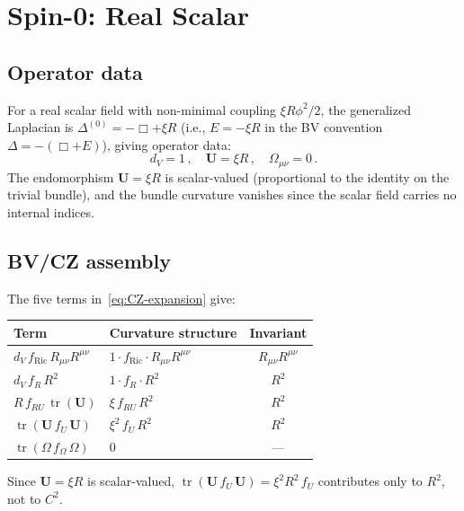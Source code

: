 \documentclass[aps,prd,twocolumn,superscriptaddress,nofootinbib,floatfix]{revtex4-2}
\theoremstyle{definition}
\theoremstyle{remark}
\newcommand{\Ricsq}{R_{\mu\nu}R^{\mu\nu}}
\newcommand{\tr}{\operatorname{tr}}
\begin{document}
\section{Spin-0: Real Scalar}
\label{sec:scalar}

\subsection{Operator data}

For a real scalar field with non-minimal coupling $\xi R\phi^2/2$, the
generalized Laplacian is
$\Delta^{(0)} = -\Box + \xi R$ (i.e., $E = -\xi R$ in the BV convention
$\Delta = -(\Box + E)$), giving operator data:
\begin{equation}
  d_V = 1\,,\quad \mathbf{U} = \xi R\,,\quad
  \Omega_{\mu\nu} = 0\,.
  \label{eq:scalar-data}
\end{equation}
The endomorphism $\mathbf{U} = \xi R$ is scalar-valued (proportional to the
identity on the trivial bundle), and the bundle curvature vanishes since
the scalar field carries no internal indices.

\subsection{BV/CZ assembly}

The five terms in~\eqref{eq:CZ-expansion} give:
\begin{center}
\renewcommand{\arraystretch}{1.15}
\begin{tabular}{@{}llc@{}}
  \toprule
  Term & Curvature structure & Invariant \\
  \midrule
  $d_V\,f_{\text{Ric}}\,\Ricsq$ & $1 \cdot f_{\text{Ric}} \cdot \Ricsq$ &
    $\Ricsq$ \\
  $d_V\,f_R\,R^2$ & $1 \cdot f_R \cdot R^2$ & $R^2$ \\
  $R\,f_{RU}\,\tr(\mathbf{U})$ & $\xi\,f_{RU}\,R^2$ & $R^2$ \\
  $\tr(\mathbf{U}\,f_U\,\mathbf{U})$ & $\xi^2\,f_U\,R^2$ & $R^2$ \\
  $\tr(\Omega\,f_\Omega\,\Omega)$ & $0$ & --- \\
  \bottomrule
\end{tabular}
\end{center}
Since $\mathbf{U} = \xi R$ is scalar-valued,
$\tr(\mathbf{U}\,f_U\,\mathbf{U}) = \xi^2 R^2\,f_U$ contributes only to
$R^2$, not to $C^2$.
\end{document}
